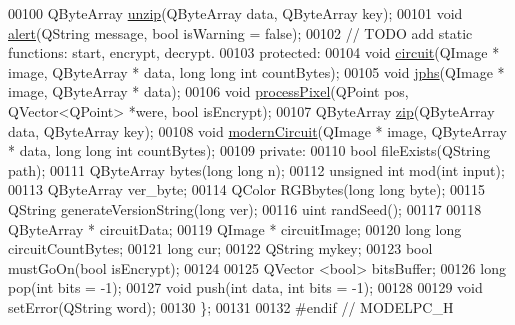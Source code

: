 \begin{DoxyCode}
00100     QByteArray \hyperlink{class_model_p_c_a6da88f166785a49f73b22c169f956fd0}{unzip}(QByteArray data, QByteArray key);
00101     \textcolor{keywordtype}{void} \hyperlink{class_model_p_c_a9079a101d83672aa48fd2dbac797de40}{alert}(QString message, \textcolor{keywordtype}{bool} isWarning = \textcolor{keyword}{false});
00102     \textcolor{comment}{// TODO add static functions: start, encrypt, decrypt.}
00103 \textcolor{keyword}{protected}:
00104     \textcolor{keywordtype}{void} \hyperlink{class_model_p_c_a1d0091062a0c836b283ec2f67411623b}{circuit}(QImage * image, QByteArray * data, \textcolor{keywordtype}{long} \textcolor{keywordtype}{long} \textcolor{keywordtype}{int} countBytes);
00105     \textcolor{keywordtype}{void} \hyperlink{class_model_p_c_a8bee0255c09449868c7e6097afaaf0cd}{jphs}(QImage * image, QByteArray * data);
00106     \textcolor{keywordtype}{void} \hyperlink{class_model_p_c_a1171f9fe1550133dc9053a46b4e5bcfd}{processPixel}(QPoint pos, QVector<QPoint> *were, \textcolor{keywordtype}{bool} isEncrypt);
00107     QByteArray \hyperlink{class_model_p_c_afebbbfa4b07deba4f68fc6dfb50f353f}{zip}(QByteArray data, QByteArray key);
00108     \textcolor{keywordtype}{void} \hyperlink{class_model_p_c_a670c3a08360555282adfd3740b2debac}{modernCircuit}(QImage * image, QByteArray * data, \textcolor{keywordtype}{long} \textcolor{keywordtype}{long} \textcolor{keywordtype}{int} countBytes);
00109 \textcolor{keyword}{private}:
00110     \textcolor{keywordtype}{bool} fileExists(QString path);
00111     QByteArray bytes(\textcolor{keywordtype}{long} \textcolor{keywordtype}{long} n);
00112     \textcolor{keywordtype}{unsigned} \textcolor{keywordtype}{int} mod(\textcolor{keywordtype}{int} input);
00113     QByteArray ver\_byte;
00114     QColor RGBbytes(\textcolor{keywordtype}{long} \textcolor{keywordtype}{long} byte);
00115     QString generateVersionString(\textcolor{keywordtype}{long} ver);
00116     uint randSeed();
00117 
00118     QByteArray * circuitData;
00119     QImage * circuitImage;
00120     \textcolor{keywordtype}{long} \textcolor{keywordtype}{long} circuitCountBytes;
00121     \textcolor{keywordtype}{long} cur;
00122     QString mykey;
00123     \textcolor{keywordtype}{bool} mustGoOn(\textcolor{keywordtype}{bool} isEncrypt);
00124 
00125     QVector <bool> bitsBuffer;
00126     \textcolor{keywordtype}{long} pop(\textcolor{keywordtype}{int} bits = -1);
00127     \textcolor{keywordtype}{void} push(\textcolor{keywordtype}{int} data, \textcolor{keywordtype}{int} bits = -1);
00128 
00129     \textcolor{keywordtype}{void} setError(QString word);
00130 \};
00131 
00132 \textcolor{preprocessor}{#endif // MODELPC\_H}
\end{DoxyCode}
